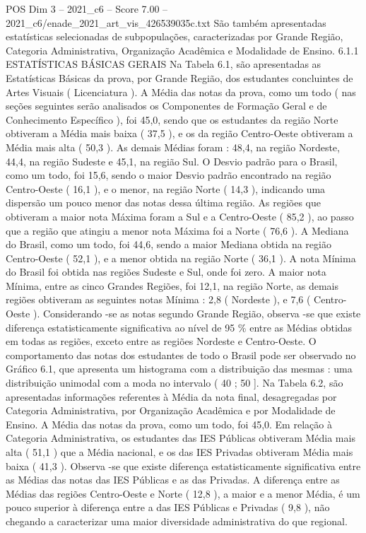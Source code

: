 \begin{textsample}{POS Dim 3 – 2021\_c6 – Score 7.00 – 2021\_c6/enade\_2021\_art\_vis\_426539035c.txt}
São também apresentadas estatísticas selecionadas de subpopulações, caracterizadas por Grande Região, Categoria Administrativa, Organização Acadêmica e Modalidade de Ensino. 6.1.1 ESTATÍSTICAS BÁSICAS GERAIS Na Tabela 6.1, são apresentadas as Estatísticas Básicas da prova, por Grande Região, dos estudantes concluintes de Artes Visuais ( Licenciatura ).
A Média das notas da prova, como um todo ( nas seções seguintes serão analisados os Componentes de Formação Geral e de Conhecimento Específico ), foi 45,0, sendo que os estudantes da região Norte obtiveram a Média mais baixa ( 37,5 ), e os da região Centro-Oeste obtiveram a Média mais alta ( 50,3 ).
As demais Médias foram : 48,4, na região Nordeste, 44,4, na região Sudeste e 45,1, na região Sul.
O Desvio padrão para o Brasil, como um todo, foi 15,6, sendo o maior Desvio padrão encontrado na região Centro-Oeste ( 16,1 ), e o menor, na região Norte ( 14,3 ), indicando uma dispersão um pouco menor das notas dessa última região.
As regiões que obtiveram a maior nota Máxima foram a Sul e a Centro-Oeste ( 85,2 ), ao passo que a região que atingiu a menor nota Máxima foi a Norte ( 76,6 ).
A Mediana do Brasil, como um todo, foi 44,6, sendo a maior Mediana obtida na região Centro-Oeste ( 52,1 ), e a menor obtida na região Norte ( 36,1 ).
A nota Mínima do Brasil foi obtida nas regiões Sudeste e Sul, onde foi zero.
A maior nota Mínima, entre as cinco Grandes Regiões, foi 12,1, na região Norte, as demais regiões obtiveram as seguintes notas Mínima : 2,8 ( Nordeste ), e 7,6 ( Centro-Oeste ).
Considerando -se as notas segundo Grande Região, observa -se que existe diferença estatisticamente significativa ao nível de 95 \% entre as Médias obtidas em todas as regiões, exceto entre as regiões Nordeste e Centro-Oeste.
O comportamento das notas dos estudantes de todo o Brasil pode ser observado no Gráfico 6.1, que apresenta um histograma com a distribuição das mesmas : uma distribuição unimodal com a moda no intervalo ( 40 ; 50 ].
Na Tabela 6.2, são apresentadas informações referentes à Média da nota final, desagregadas por Categoria Administrativa, por Organização Acadêmica e por Modalidade de Ensino.
A Média das notas da prova, como um todo, foi 45,0.
Em relação à Categoria Administrativa, os estudantes das IES Públicas obtiveram Média mais alta ( 51,1 ) que a Média nacional, e os das IES Privadas obtiveram Média mais baixa ( 41,3 ).
Observa -se que existe diferença estatisticamente significativa entre as Médias das notas das IES Públicas e as das Privadas.
A diferença entre as Médias das regiões Centro-Oeste e Norte ( 12,8 ), a maior e a menor Média, é um pouco superior à diferença entre a das IES Públicas e Privadas ( 9,8 ), não chegando a caracterizar uma maior diversidade administrativa do que regional.

\end{textsample}
